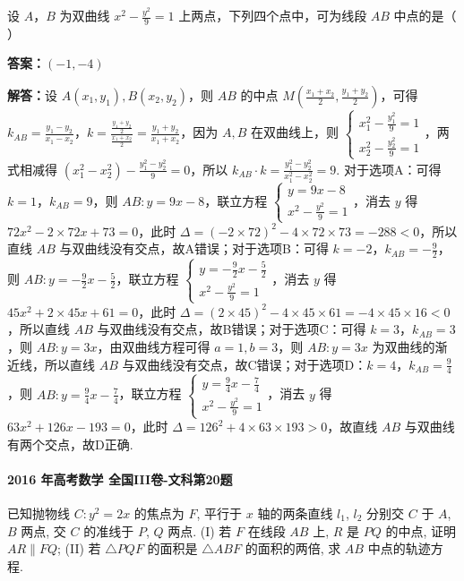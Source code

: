 \documentclass[UTF8,a4paper,11pt]{ctexart}
\begin{document}
设 $A$，$B$ 为双曲线 $x^2-\frac{y^2}{9}=1$ 上两点，下列四个点中，可为线段 $AB$ 中点的是（ ）

\textbf{答案：}$(-1,-4)$\par

\textbf{解答：}设 $A(x_1,y_1),B(x_2,y_2)$，则 $AB$ 的中点 $M(\frac{x_1+x_2}{2},\frac{y_1+y_2}{2})$，可得 $k_{AB}=\frac{y_1-y_2}{x_1-x_2}$，$k=\frac{\frac{y_1+y_2}{2}}{\frac{x_1+x_2}{2}}=\frac{y_1+y_2}{x_1+x_2}$，因为 $A,B$ 在双曲线上，则 $\begin{cases} x_1^2-\frac{y_1^2}{9}=1 \\ x_2^2-\frac{y_2^2}{9}=1 \end{cases}$，两式相减得 $(x_1^2-x_2^2)-\frac{y_1^2-y_2^2}{9}=0$，所以 $k_{AB}\cdot k=\frac{y_1^2-y_2^2}{x_1^2-x_2^2}=9$. 对于选项A：可得 $k=1$，$k_{AB}=9$，则 $AB:y=9x-8$，联立方程 $\begin{cases} y=9x-8 \\ x^2-\frac{y^2}{9}=1 \end{cases}$，消去 $y$ 得 $72x^2-2\times72x+73=0$，此时 $\Delta=(-2\times72)^2-4\times72\times73=-288<0$，所以直线 $AB$ 与双曲线没有交点，故A错误；对于选项B：可得 $k=-2$，$k_{AB}=-\frac{9}{2}$，则 $AB:y=-\frac{9}{2}x-\frac{5}{2}$，联立方程 $\begin{cases} y=-\frac{9}{2}x-\frac{5}{2} \\ x^2-\frac{y^2}{9}=1 \end{cases}$，消去 $y$ 得 $45x^2+2\times45x+61=0$，此时 $\Delta=(2\times45)^2-4\times45\times61=-4\times45\times16<0$，所以直线 $AB$ 与双曲线没有交点，故B错误；对于选项C：可得 $k=3$，$k_{AB}=3$，则 $AB:y=3x$，由双曲线方程可得 $a=1,b=3$，则 $AB:y=3x$ 为双曲线的渐近线，所以直线 $AB$ 与双曲线没有交点，故C错误；对于选项D：$k=4$，$k_{AB}=\frac{9}{4}$，则 $AB:y=\frac{9}{4}x-\frac{7}{4}$，联立方程 $\begin{cases} y=\frac{9}{4}x-\frac{7}{4} \\ x^2-\frac{y^2}{9}=1 \end{cases}$，消去 $y$ 得 $63x^2+126x-193=0$，此时 $\Delta=126^2+4\times63\times193>0$，故直线 $AB$ 与双曲线有两个交点，故D正确.

\paragraph{2016 年高考数学 全国III卷-文科第20题}

已知抛物线 $C: y^2=2x$ 的焦点为 $F$, 平行于 $x$ 轴的两条直线 $l_1$, $l_2$ 分别交 $C$ 于 $A$, $B$ 两点, 交 $C$ 的准线于 $P$, $Q$ 两点.
(I) 若 $F$ 在线段 $AB$ 上, $R$ 是 $PQ$ 的中点, 证明 $AR\parallel FQ$;
(II) 若 $\triangle PQF$ 的面积是 $\triangle ABF$ 的面积的两倍, 求 $AB$ 中点的轨迹方程.
\end{document}
